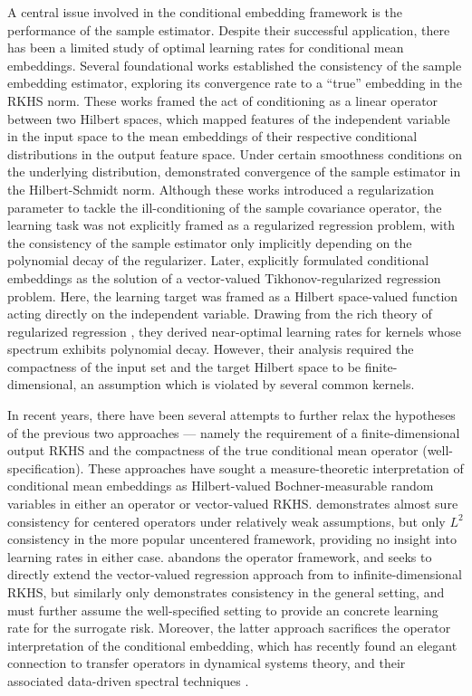 \documentclass[accepted]{article}
\theoremstyle{definition}
\begin{document}
A central issue involved in the conditional embedding framework is the performance of the sample estimator. Despite their successful application, there has been a limited study of optimal learning rates for conditional mean embeddings. Several foundational works \citep{song2010nonparametric, song2009hilbert} established the consistency of the sample embedding estimator, exploring its convergence rate to a ``true'' embedding in the RKHS norm. These works framed the act of conditioning  as a linear operator between two Hilbert spaces, which mapped features of the independent variable in the input space to the mean embeddings of their respective conditional distributions in the output feature space. Under certain smoothness conditions on the underlying distribution,  \cite{song2010nonparametric} demonstrated convergence of the sample estimator in the Hilbert-Schmidt norm. Although these works introduced a regularization parameter to tackle the ill-conditioning of the sample covariance operator, the learning task was not explicitly framed as a regularized regression problem, with the consistency of the sample estimator  only implicitly depending on the polynomial decay of the regularizer. Later, \cite{grunewalder2012conditional} explicitly formulated conditional embeddings as the solution of a vector-valued Tikhonov-regularized regression problem. Here, the learning target was framed as a Hilbert space-valued function acting directly on the independent variable. Drawing from the rich theory of regularized regression \citep{caponnetto2007optimal}, they derived near-optimal learning rates for kernels whose spectrum exhibits polynomial decay. However, their analysis required the compactness of the input set and the target Hilbert space to be finite-dimensional, an assumption which is violated by several common kernels. 

In recent years, there have been several attempts to further relax the hypotheses of the previous two approaches — namely the requirement of a finite-dimensional output RKHS and the compactness of the true conditional mean operator (well-specification). These approaches have sought a measure-theoretic interpretation of conditional mean embeddings as Hilbert-valued Bochner-measurable random variables in either an operator or vector-valued RKHS. \cite{klebanov2020rigorous} demonstrates almost sure consistency for centered operators under relatively weak assumptions, but only $L^2$ consistency in the more popular uncentered framework, providing no insight into learning rates in either case. \cite{park2020measure} abandons the operator framework, and seeks to directly extend the vector-valued regression approach from \cite{grunewalder2012conditional} to infinite-dimensional RKHS, but similarly only demonstrates consistency in the general setting, and must further assume the well-specified setting to provide an concrete learning rate for the surrogate risk. Moreover, the latter approach sacrifices the operator interpretation of the conditional embedding, which has recently found an elegant connection to transfer operators in dynamical systems theory, and their associated data-driven spectral techniques \citep{mollenhauer2020kernel, klus2018data}.
\end{document}

